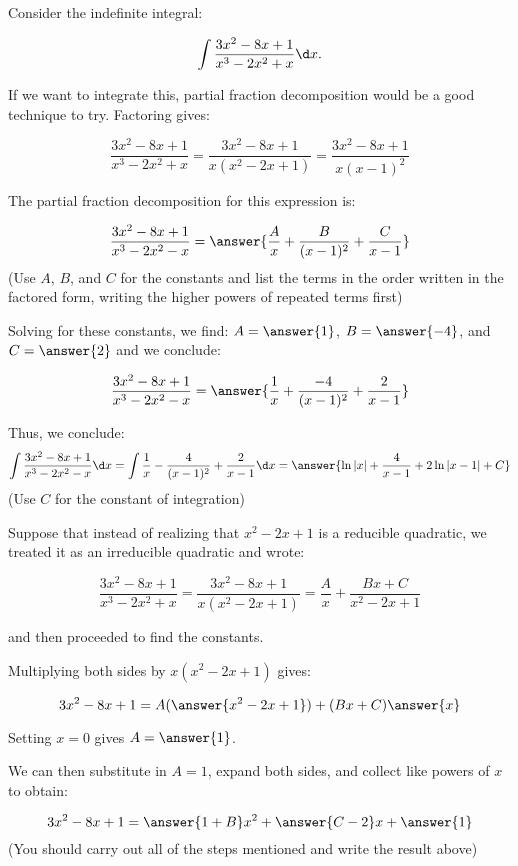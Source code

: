 \documentclass{ximera}
\author{Jim Talamo}
\begin{document}
\begin{exercise}
Consider the indefinite integral: 

\[
\int \frac{3x^2-8x+1}{x^3-2x^2+x} \d x.
\]

If we want to integrate this, partial fraction decomposition would be a good technique to try.  Factoring gives:

\[
\frac{3x^2-8x+1}{x^3-2x^2+x}  =\frac{3x^2-8x+1}{x(x^2-2x+1)} =\frac{3x^2-8x+1}{x(x-1)^2} 
\]  

The partial fraction decomposition for this expression is:

\[
\frac{3x^2-8x+1}{x^3-2x^2-x}= \answer{\frac{A}{x}+\frac{B}{(x-1)^2}+\frac{C}{x-1}}
\]
(Use $A$, $B$, and $C$ for the constants and list the terms in the order written in the factored form, writing the higher powers of repeated terms first)

\begin{exercise}
Solving for these constants, we find: $A = \answer{1}$, $B=\answer{-4}$, and $C=\answer{2}$ and we conclude:

\[
\frac{3x^2-8x+1}{x^3-2x^2-x}= \answer{\frac{1}{x}+\frac{-4}{(x-1)^2}+\frac{2}{x-1}}
\]

\begin{exercise}
Thus, we conclude:
\[
\int \frac{3x^2-8x+1}{x^3-2x^2-x} \d x = \int \frac{1}{x}-\frac{4}{(x-1)^2}+\frac{2}{x-1} \d x = \answer{\ln|x|+\frac{4}{x-1}+2\ln|x-1| +C}
\]
(Use $C$ for the constant of integration)


\begin{exercise}
Suppose that instead of realizing that $x^2-2x+1$ is a reducible quadratic, we treated it as an irreducible quadratic and wrote:


\[
\frac{3x^2-8x+1}{x^3-2x^2+x}  =\frac{3x^2-8x+1}{x(x^2-2x+1)} =\frac{A}{x}+\frac{Bx+C}{x^2-2x+1} 
\]  

and then proceeded to find the constants.

\begin{exercise}

Multiplying both sides by $x(x^2-2x+1)$ gives:

\[
3x^2-8x+1 = A(\answer{x^2-2x+1})+(Bx+C)\answer{x}
\]  

\begin{exercise}
Setting $x=0$ gives $A=\answer{1}$.

We can then substitute in $A=1$, expand both sides, and collect like powers of $x$ to obtain:

\[
3x^2-8x+1 = \answer{1+B}x^2+\answer{C-2}x+\answer{1}
\]
(You should carry out all of the steps mentioned and write the result above)


\end{exercise}
\end{exercise}
\end{exercise}
\end{exercise}
\end{exercise}
\end{exercise}
\end{document}
